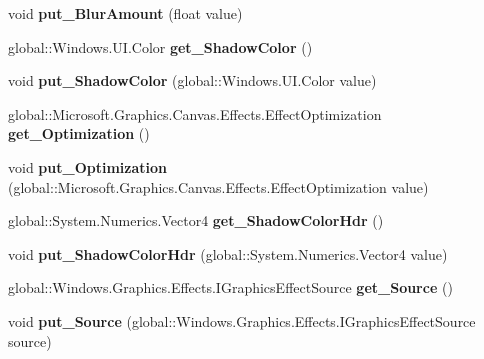\begin{DoxyCompactItemize}
void {\bfseries put\+\_\+\+Blur\+Amount} (float value)
\item 
\mbox{\label{interface_microsoft_1_1_graphics_1_1_canvas_1_1_effects_1_1_i_shadow_effect_adcb13593e07a265b7d02f8cc8a31445a}} 
global\+::\+Windows.\+U\+I.\+Color {\bfseries get\+\_\+\+Shadow\+Color} ()
\item 
\mbox{\label{interface_microsoft_1_1_graphics_1_1_canvas_1_1_effects_1_1_i_shadow_effect_aa05abfa69f066a62740ff1025d57fd9c}} 
void {\bfseries put\+\_\+\+Shadow\+Color} (global\+::\+Windows.\+U\+I.\+Color value)
\item 
\mbox{\label{interface_microsoft_1_1_graphics_1_1_canvas_1_1_effects_1_1_i_shadow_effect_a3d8042cc4e97fb3285cfbbb0f3c8a52f}} 
global\+::\+Microsoft.\+Graphics.\+Canvas.\+Effects.\+Effect\+Optimization {\bfseries get\+\_\+\+Optimization} ()
\item 
\mbox{\label{interface_microsoft_1_1_graphics_1_1_canvas_1_1_effects_1_1_i_shadow_effect_a47609594c0d8db1c5d91cfbd3413feba}} 
void {\bfseries put\+\_\+\+Optimization} (global\+::\+Microsoft.\+Graphics.\+Canvas.\+Effects.\+Effect\+Optimization value)
\item 
\mbox{\label{interface_microsoft_1_1_graphics_1_1_canvas_1_1_effects_1_1_i_shadow_effect_aac90c7161656038d0dfc1177b36c6c66}} 
global\+::\+System.\+Numerics.\+Vector4 {\bfseries get\+\_\+\+Shadow\+Color\+Hdr} ()
\item 
\mbox{\label{interface_microsoft_1_1_graphics_1_1_canvas_1_1_effects_1_1_i_shadow_effect_ae97d7959236ba2f08e531718a11a4983}} 
void {\bfseries put\+\_\+\+Shadow\+Color\+Hdr} (global\+::\+System.\+Numerics.\+Vector4 value)
\item 
\mbox{\label{interface_microsoft_1_1_graphics_1_1_canvas_1_1_effects_1_1_i_shadow_effect_a344919ac690c7502e2a1c28ee4f5966f}} 
global\+::\+Windows.\+Graphics.\+Effects.\+I\+Graphics\+Effect\+Source {\bfseries get\+\_\+\+Source} ()
\item 
\mbox{\label{interface_microsoft_1_1_graphics_1_1_canvas_1_1_effects_1_1_i_shadow_effect_acea577b60a4e50cef4fea7cdea1764f9}} 
void {\bfseries put\+\_\+\+Source} (global\+::\+Windows.\+Graphics.\+Effects.\+I\+Graphics\+Effect\+Source source)
\end{DoxyCompactItemize}



